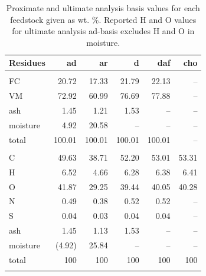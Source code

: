 \documentclass[12pt,titlepage]{article}
\begin{document}
\newpage
\begin{longtable}{lrrrrr}
    \caption{Proximate and ultimate analysis basis values for each feedstock given as wt. \%. Reported H and O values for ultimate analysis ad-basis excludes H and O in moisture.}
    \label{tab:basis} \\

    \textbf{Residues} & ad & ar & d & daf & cho \\
    \hline \\
    FC       & 20.72  & 17.33  & 21.79  & 22.13  & -- \\
    VM       & 72.92  & 60.99  & 76.69  & 77.88  & -- \\
    ash      & 1.45   & 1.21   & 1.53   & --     & -- \\
    moisture & 4.92   & 20.58  & --     & --     & -- \\
    total    & 100.01 & 100.01 & 100.01 & 100.01 & -- \\
    \\
    C        & 49.63  & 38.71 & 52.20 & 53.01 & 53.31 \\
    H        & 6.52   & 4.66  & 6.28  & 6.38  & 6.41 \\
    O        & 41.87  & 29.25 & 39.44 & 40.05 & 40.28 \\
    N        & 0.49   & 0.38  & 0.52  & 0.52  & -- \\
    S        & 0.04   & 0.03  & 0.04  & 0.04  & -- \\
    ash      & 1.45   & 1.13  & 1.53  & --    & -- \\
    moisture & (4.92) & 25.84 & --    & --    & -- \\
    total    & 100    & 100   & 100   & 100   & 100 \\
    \\


\end{longtable}
\end{document}
